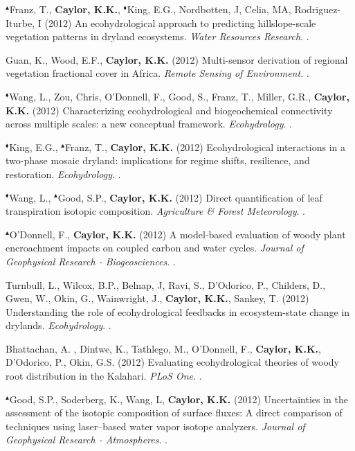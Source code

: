 \begin{etaremune}
\item $^{\blacktriangle}$Franz, T., \textbf{ Caylor, K.K.}, $^{\blacklozenge}$King, E.G., Nordbotten, J, Celia, MA, Rodriguez-Iturbe, I (2012) An ecohydrological approach to predicting hillslope-scale vegetation patterns in dryland ecosystems. \emph{Water Resources Research}. .
\item Guan, K., Wood, E.F., \textbf{ Caylor, K.K.} (2012) Multi-sensor derivation of regional vegetation fractional cover in Africa. \emph{Remote Sensing of Environment}. .
\item $^{\blacklozenge}$Wang, L., Zou, Chris, O'Donnell, F., Good, S., Franz, T., Miller, G.R., \textbf{ Caylor, K.K.} (2012) Characterizing ecohydrological and biogeochemical connectivity across multiple scales: a new conceptual framework. \emph{Ecohydrology}. .
\item $^{\blacklozenge}$King, E.G., $^{\blacktriangle}$Franz, T., \textbf{ Caylor, K.K.} (2012) Ecohydrological interactions in a two-phase mosaic dryland: implications for regime shifts, resilience, and restoration. \emph{Ecohydrology}. .
\item $^{\blacklozenge}$Wang, L., $^{\blacktriangle}$Good, S.P., \textbf{ Caylor, K.K.} (2012) Direct quantification of leaf transpiration isotopic composition. \emph{Agriculture \& Forest Meteorology}. .
\item $^{\blacktriangle}$O'Donnell, F., \textbf{ Caylor, K.K.} (2012) A model-based evaluation of woody plant encroachment impacts on coupled carbon and water cycles. \emph{Journal of Geophysical Research - Biogeosciences}. .
\item Turnbull, L., Wilcox, B.P., Belnap, J, Ravi, S., D'Odorico, P., Childers, D., Gwen, W., Okin, G., Wainwright, J., \textbf{ Caylor, K.K.}, Sankey, T. (2012) Understanding the role of ecohydrological feedbacks in ecosystem-state change in drylands. \emph{Ecohydrology}. .
\item Bhattachan, A. , Dintwe, K., Tathlego, M., O'Donnell, F., \textbf{ Caylor, K.K.}, D'Odorico, P., Okin, G.S. (2012) Evaluating ecohydrological theories of woody root distribution in the Kalahari. \emph{PLoS One}. .
\item $^{\blacktriangle}$Good, S.P., Soderberg, K., Wang, L, \textbf{ Caylor, K.K.} (2012) Uncertainties in the assessment of the isotopic composition of surface fluxes: A direct comparison of techniques using laser--based water vapor isotope analyzers. \emph{Journal of Geophysical Research - Atmospheres}. .

\end{etaremune}
